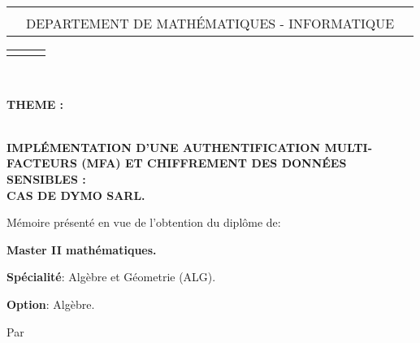 \documentclass[a4paper, 14pt]{report}
\begin{document}
	\begin{center}
		\begin{tabularx}{\textwidth}{>{\centering}XcX<{\centering}}
			
			& & \\
			& DEPARTEMENT DE MATHÉMATIQUES - INFORMATIQUE & \\
			
		\end{tabularx}
	\end{center}
	\begin{tabularx}{\textwidth}{>{\centering}XcX<{\centering}}
		& & \\
		
	\end{tabularx}\\
	\begin{center}
		
		\textbf{ THEME :}
		\begin{tcolorbox}[
			colframe=blue!70,      %
			colback=blue!10,       %
			coltitle=black,        %
			boxrule=1mm,         %
			arc=5mm,               %
			width=\textwidth ,      %
			center                 %
			]
			\centering
			
			{\textbf{\large \\
					IMPLÉMENTATION D'UNE AUTHENTIFICATION MULTI-FACTEURS (MFA) ET CHIFFREMENT DES DONNÉES SENSIBLES : \\
					CAS DE DYMO SARL.\\ }}
		\end{tcolorbox}
		
		\vspace{1cm}
		
		
		{\fontsize{14}{12}\selectfont
			
			Mémoire présenté en vue de l’obtention du diplôme de:
			\begin{center}
				\textbf{Master II mathématiques.}
			\end{center}
			
			\textbf{Spécialité}: Algèbre et Géometrie (ALG).
			
			\begin{center}
				\textbf{Option}: Algèbre.
			\end{center}
			
			\begin{center}
				Par
			\end{center}
			
}
\end{center}
\end{document}
